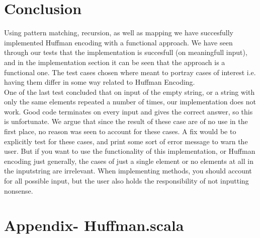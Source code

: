 \documentclass{article}
\begin{document}
\section{Conclusion}
Using pattern matching, recursion, as well as mapping we have succesfully implemented Huffman encoding with a functional approach. We have seen through our tests that the implementation is succesfull (on meaningfull input), and in the implementation section it can be seen that the approach is a functional one. The test cases chosen where meant to portray cases of interest i.e. having them differ in some way related to Huffman Encoding.  
\newline
\\
One of the last test concluded that on input of the empty string, or a string with only the same elements repeated a number of times, our implementation does not work. Good code terminates on every input and gives the correct answer, so this is unfortunate. 
\newline
 We argue that since the result of these case are of no use in the first place, no reason was seen to account for these cases. A fix would be to explicitly test for these cases, and print some sort of error message to warn the user. But if you want to use the functionality of this implementation, or Huffman encoding just generally, the cases of just a single element or no elements at all in the inputstring are irrelevant. When implementing methods, you should account for all possible input, but the user also holds the responsibility of not inputting nonsense. 
\section{Appendix- Huffman.scala}

\end{document}
